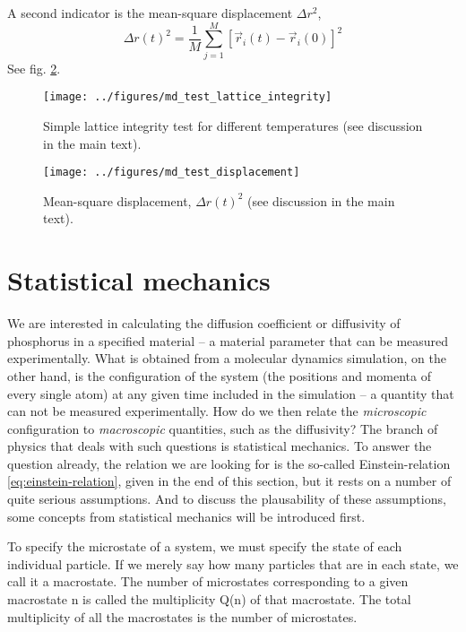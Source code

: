 \documentclass[11pt,bibliography=totoc,index=totoc]{scrbook}   %
\begin{document}
A second indicator is the mean-square displacement $\Delta r^2$,
\begin{equation}
  \Delta r(t)^2 = \frac{1}{M}\sum_{j=1}^M [\vec{r}_i(t)-\vec{r}_i(0)]^2
\end{equation}
See fig. \ref{fig:md_test_displacement}.

\begin{figure}[htbp]
  \begin{center}
    \texttt{[image: ../figures/md\_test\_lattice\_integrity]}
  \end{center}
  \caption{Simple lattice integrity test for different temperatures (see discussion in the main text).}
  \label{fig:md_test_lattice_integrity}
\end{figure}

\begin{figure}[htbp]
  \begin{center}
    \texttt{[image: ../figures/md\_test\_displacement]}
  \end{center}
  \caption{Mean-square displacement, $\Delta r(t)^2$ (see discussion in the main text).}
  \label{fig:md_test_displacement}
\end{figure}

\section{Statistical mechanics}

We are interested in calculating the diffusion coefficient or diffusivity of phosphorus in a specified material -- 
a material parameter that can be measured experimentally.
What is obtained from a molecular dynamics simulation, on the other hand, is the configuration of the system (the positions and momenta of every single atom) at any given time included in the simulation -- a quantity that can not be measured experimentally. 
How do we then relate the \emph{microscopic} configuration to \emph{macroscopic} quantities, such as the diffusivity?
The branch of physics that deals with such questions is statistical mechanics. 
To answer the question already, the relation we are looking for is the so-called Einstein-relation \eqref{eq:einstein-relation}, given in the end of this section, but it rests on a number of quite serious assumptions. 
And to discuss the plausability of these assumptions, some concepts from statistical mechanics will be introduced first.

To specify the microstate of a system, we must specify the state of each individual particle. If we merely say how many particles that are in each state, we call it a macrostate. The number of microstates corresponding to a given macrostate n is called the multiplicity Q(n) of that macrostate. The total multiplicity of all the macrostates is the number of microstates.
\end{document}
